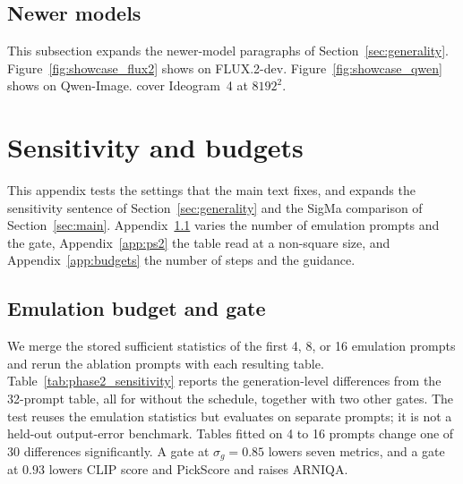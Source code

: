 \ifanynewmodel
\subsection{Newer models}
\label{app:newer}

This subsection expands the newer-model paragraphs of Section~\ref{sec:generality}.\ifresfluxtwo{} Figure~\ref{fig:showcase_flux2} shows \sca{} on FLUX.2-dev.\fi\ifresqwen{} Figure~\ref{fig:showcase_qwen} shows \sca{} on Qwen-Image.\fi\ifresideogram{} \ideogramRefs{} cover Ideogram~4 at $8192^2$.\fi

\ifresfluxtwo{}\fi
\ifresqwen{}\fi
\ifresideogram{}\fi
\fi

\apxbarrier
\section{Sensitivity and budgets}
\label{app:budget}

This appendix tests the settings that the main text fixes, and expands the sensitivity sentence of Section~\ref{sec:generality} and the SigMa comparison of Section~\ref{sec:main}. Appendix~\ref{app:sens} varies the number of emulation prompts and the gate, Appendix~\ref{app:ps2} the table read at a non-square size, and Appendix~\ref{app:budgets} the number of steps and the guidance.

\subsection{Emulation budget and gate}
\label{app:sens}

We merge the stored sufficient statistics of the first 4, 8, or 16 emulation prompts and rerun the \nabl{} ablation prompts with each resulting table. Table~\ref{tab:phase2_sensitivity} reports the generation-level differences from the 32-prompt table, all for \sca{} without the schedule, together with two other gates. The test reuses the emulation statistics but evaluates on separate prompts; it is not a held-out output-error benchmark. Tables fitted on 4 to 16 prompts change one of 30 differences significantly. A gate at $\sigma_g=0.85$ lowers seven metrics, and a gate at $0.93$ lowers CLIP score and PickScore and raises ARNIQA.

